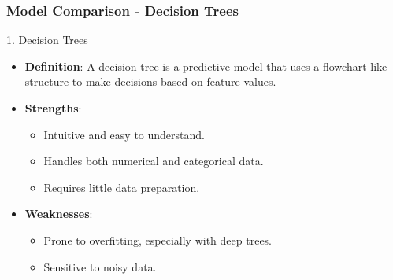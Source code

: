 \documentclass[aspectratio=169]{beamer}
\begin{document}
\begin{frame}[fragile]
    \frametitle{Model Comparison - Decision Trees}

    \begin{block}{1. Decision Trees}
        \begin{itemize}
            \item \textbf{Definition}: A decision tree is a predictive model that uses a flowchart-like structure to make decisions based on feature values.
            \item \textbf{Strengths}:
                \begin{itemize}
                    \item Intuitive and easy to understand.
                    \item Handles both numerical and categorical data.
                    \item Requires little data preparation.
                \end{itemize}
            \item \textbf{Weaknesses}:
                \begin{itemize}
                    \item Prone to overfitting, especially with deep trees.
                    \item Sensitive to noisy data.
                \end{itemize}
        \end{itemize}
    \end{block}
\end{frame}
\end{document}
